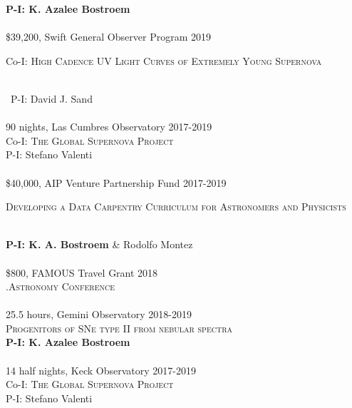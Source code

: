 \documentclass[10pt]{cv}
\begin{document}
\begin{llist}
\textbf{P-I: K. Azalee Bostroem}\\
\\
\$39,200, Swift General Observer Program \hfill 2019\\
\begin{minipage}[l]{0.7\textwidth}\vspace{0.15cm}
Co-I: \textsc{High Cadence UV Light Curves of Extremely Young Supernova}
\end{minipage}\vspace{0.15cm}\\\
P-I: David J. Sand\\
\\
90 nights, Las Cumbres Observatory \hfill 2017-2019\\
Co-I: \textsc{The Global Supernova Project}\\
P-I: Stefano Valenti \\
\\
\$40,000, AIP Venture Partnership Fund \hfill 2017-2019\\
\begin{minipage}[l]{0.7\textwidth}\vspace{0.15cm}
\textsc{Developing a Data Carpentry Curriculum for Astronomers and Physicists}
\end{minipage}\vspace{0.15cm}\\
{\bf P-I: K. A. Bostroem} \& Rodolfo Montez\\
\\
\$800, FAMOUS Travel Grant \hfill2018\\ 
\textsc{.Astronomy Conference}\\
\\
25.5 hours, Gemini Observatory \hfill 2018-2019\\
\textsc{Progenitors of SNe type II from nebular spectra}\\
{\bf P-I: K. Azalee Bostroem} \\
\\
14 half nights, Keck Observatory \hfill 2017-2019\\
Co-I: \textsc{The Global Supernova Project}\\
P-I: Stefano Valenti \\

\end{llist}
\end{document}

